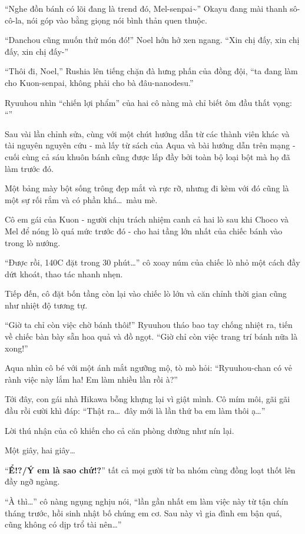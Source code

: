 \documentclass[../main.tex]{subfiles}
\begin{document}
``Nghe đồn bánh có lõi đang là trend đó, Mel-senpai\~{}'' Okayu đang mài thanh sô-cô-la, nói góp vào bằng giọng nói bình thản quen thuộc.

``Danchou cũng muốn thử món đó!'' Noel hớn hở xen ngang. ``Xin chị đấy, xin chị đấy, xin chị đấy-''

``Thôi đi, Noel,'' Rushia lên tiếng chặn đà hưng phấn của đồng đội, ``ta đang làm cho Kuon-senpai, không phải cho bà đâu-nanodesu.''

Ryuuhou nhìn ``chiến lợi phẩm'' của hai cô nàng mà chỉ biết ôm đầu thất vọng: ``''

Sau vài lần chỉnh sửa, cùng với một chút hướng dẫn từ các thành viên khác và tài nguyên nguyên cứu - mà lấy từ sách của Aqua và bài hướng dẫn trên mạng - cuối cùng cả sáu khuôn bánh cũng được lấp đầy bởi toàn bộ loại bột mà họ đã làm trước đó.

Một bảng mày bột sống trông đẹp mắt và rực rỡ, nhưng đi kèm với đó cũng là một sự rối rắm và có phần khá\dots\ màu mè.

\ct

Cô em gái của Kuon - người chịu trách nhiệm canh cả hai lò sau khi Choco và Mel để nóng lò quá mức trước đó - cho hai tầng lớn nhất của chiếc bánh vào trong lò nướng.

``Được rồi, 140\degree C đặt trong 30 phút\dots'' cô xoay núm của chiếc lò nhỏ một cách đầy dứt khoát, thao tác nhanh nhẹn.

Tiếp đến, cô đặt bốn tầng còn lại vào chiếc lò lớn và căn chỉnh thời gian cũng như nhiệt độ tương tự.

``Giờ ta chỉ còn việc chờ bánh thôi!'' Ryuuhou tháo bao tay chống nhiệt ra, tiến về chiếc bàn bày sẵn hoa quả và đồ ngọt. ``Giờ chỉ còn việc trang trí bánh nữa là xong!''

Aqua nhìn cô bé với một ánh mắt ngưỡng mộ, tò mò hỏi: ``Ryuuhou-chan có vẻ rành việc này lắm ha! Em làm nhiều lần rồi à?''

Tới đây, con gái nhà Hikawa bỗng khựng lại vì giật mình. Cô mím môi, gãi gãi đầu rồi cười khì đáp: ``Thật ra\dots\ đây mới là lần thứ ba em làm thôi ạ\dots''

Lời thú nhận của cô khiến cho cả căn phòng dường như nín lại.

Một giây, hai giây\dots

``\textbf{Ể!?/Ý em là sao chứ!?}'' tất cả mọi gười từ ba nhóm cùng đồng loạt thốt lên đầy ngỡ ngàng.

``À thì\dots'' cô nàng ngụng nghịu nói, ``lần gần nhất em làm việc này từ tận chín tháng trước, hồi sinh nhật bố chúng em cơ. Sau này vì gia đình em bận quá, cũng không có dịp trổ tài nên\dots''
\end{document}
